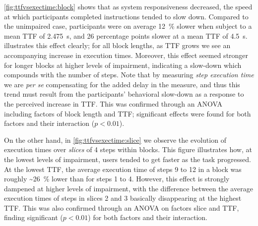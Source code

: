 \cref{fig:ttfvsexectime:block} shows that as system responsiveness decreased, the speed at which participants completed instructions tended to slow down.
Compared to the unimpaired case, participants were on average \SI{12}{\percent} slower when subject to a mean \gls{TTF} of \SI{2.475}{\second}, and \num{26} percentage points slower at a mean \gls{TTF} of \SI{4.5}{\second}.
 illustrates this effect clearly;
for all block lengths, as \gls{TTF} grows we see an accompanying increase in execution times.
Moreover, this effect seemed stronger for longer blocks at higher levels of impairment, indicating a slow-down which compounds with the number of steps.
Note that by measuring \emph{step execution time} we are \emph{per se} compensating for the added delay in the measure, and thus this trend must result from the participants' behavioral slow-down as a response to the perceived increase in \gls{TTF}.
This was confirmed through an \gls{ANOVA}~\cite{fujikoshi1993two} including factors of block length and \gls{TTF}; significant effects were found for both factors and their interaction (\ensuremath{p < 0.01}).

On the other hand, in \cref{fig:ttfvsexectime:slice} we observe the evolution of execution times over \emph{slices} of \num{4} steps within blocks.
This figure illustrates how, at the lowest levels of impairment, users tended to get faster as the task progressed.
At the lowest \gls{TTF}, the average execution time of steps \num{9} to \num{12} in a block was roughly \textasciitilde\SI{26}{\percent} lower than for steps \num{1} to \num{4}.
However, this effect is strongly dampened at higher levels of impairment, with the difference between the average execution times of steps in slices \num{2} and \num{3} basically disappearing at the highest \gls{TTF}.
This was also confirmed through an \gls{ANOVA} on factors slice and \gls{TTF}, finding significant (\ensuremath{p < 0.01}) for both factors and their interaction.

